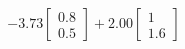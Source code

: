\documentclass[preview]{standalone}
\begin{document}
\begin{align*}
-3.73 \begin{bmatrix} 0.8 \\ 0.5 \end{bmatrix} + 2.00 \begin{bmatrix} 1 \\ 1.6 \end{bmatrix}
\end{align*}
\end{document}
